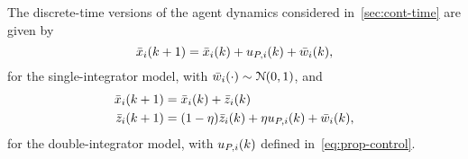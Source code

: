 
The discrete-time versions of the agent dynamics considered in~\autoref{sec:cont-time} are given by
\begin{equation}\label{eq:disc-time-single-int-model}
	\bar{x}_{i}(k+1) = \bar{x}_{i}(k) + u_{P,i}(k) + \bar{w}_{i}(k),
\end{equation}
for the single-integrator model, with $ \bar{w}_{i}(\cdot)\sim\mathcal{N}(0,1) $, and
\begin{equation}\label{eq:disc-time-double-int-model}
	\begin{aligned}
		\bar{x}_{i}(k+1) &= \bar{x}_{i}(k) + \bar{z}_{i}(k)\\
		\bar{z}_{i}(k+1) &= (1-\eta)\bar{z}_{i}(k) + \eta u_{P,i}(k) + \bar{w}_{i}(k),
	\end{aligned}
\end{equation}
for the double-integrator model,
with $ u_{P,i}(k) $ defined in~\eqref{eq:prop-control}.